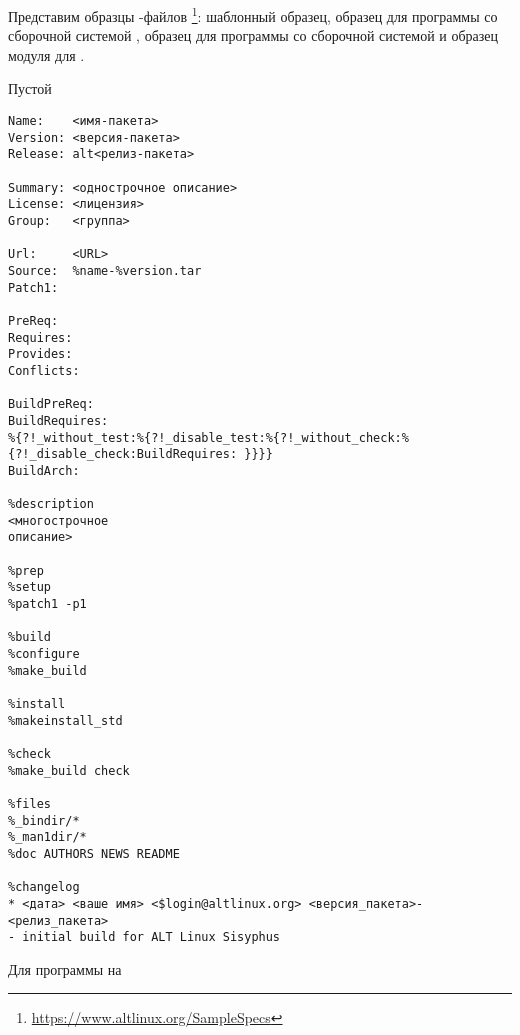 Представим образцы -файлов%
\footnote{\href{https://www.altlinux.org/SampleSpecs}{https://www.altlinux.org/SampleSpecs}}: шаблонный образец,
образец для программы со сборочной системой , образец для программы со сборочной системой
 и образец модуля для .

 Пустой 
\begin{Verbatim}[breaklines=true,breakanywhere=true,fontsize=\scriptsize]
Name:    <имя-пакета>
Version: <версия-пакета>
Release: alt<релиз-пакета>
	
Summary: <однострочное описание>
License: <лицензия>
Group:   <группа>

Url:     <URL>
Source:  %name-%version.tar
Patch1:

PreReq:
Requires:
Provides:
Conflicts:

BuildPreReq:
BuildRequires:
%{?!_without_test:%{?!_disable_test:%{?!_without_check:%{?!_disable_check:BuildRequires: }}}}
BuildArch:

%description
<многострочное
описание>

%prep
%setup
%patch1 -p1

%build
%configure
%make_build

%install
%makeinstall_std

%check
%make_build check

%files
%_bindir/*
%_man1dir/*
%doc AUTHORS NEWS README

%changelog
* <дата> <ваше имя> <$login@altlinux.org> <версия_пакета>-<релиз_пакета>
- initial build for ALT Linux Sisyphus
\end{Verbatim}


 Для программы на 
	
